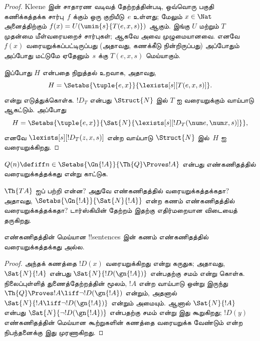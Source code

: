 \documentclass[../../../include/open-logic-section]{subfiles}
\begin{document}
\begin{proof}
Kleene இன் சாதாரண வடிவத் தேற்றத்தின்படி, ஒவ்வொரு பகுதி
கணிக்கத்தக்க சார்பு~$f$ க்கும் ஒரு குறியீடு~$e$ உள்ளது; மேலும்
$x \in \Nat$ அனைத்திற்கும்
$f(x) = U(\umin{s}{T(e,x,s)})$ ஆகும். இங்கு $U$ மற்றும் $T$
முதன்மை மீள்வரையறைச் சார்புகள்; ஆகவே அவை முழுமையானவை. எனவே
$f(x)$ வரையறுக்கப்பட்டிருப்பது (அதாவது, கணக்கீடு நின்றிருப்பது)
அப்போதும் அப்போது மட்டுமே ஏதேனும்~$s$ க்கு $T(e,x,s)$
மெய்யாகும்.

இப்போது $H$ என்பதை நிறுத்தல் உறவாக, அதாவது,
\[
H = \Setabs{\tuple{e,x}}{\lexists[s][T(e, x, s)]}.
\]
என்று எடுத்துக்கொள்க. $!D_T$ என்பது $\Struct{N}$ இல் $T$ ஐ
வரையறுக்கும் வாய்பாடு ஆகட்டும். அப்போது
\[
H = \Setabs{\tuple{e,x}}{\Sat{N}{\lexists[s][!D_T(\num e, \num x, s)]}},
\]
எனவே $\lexists[s][!D_T(z, x, s)]$ என்ற வாய்பாடு
$\Struct{N}$ இல்~$H$ ஐ வரையறுக்கிறது.
\end{proof}

\begin{prob}
$Q(n) \defiff n \in \Setabs{\Gn{!A}}{\Th{Q} \Proves !A}$ என்பது
எண்கணிதத்தில் வரையறுக்கத்தக்கது என்று காட்டுக.
\end{prob}

$\Th{TA}$ ஐப் பற்றி என்ன? அதுவே எண்கணிதத்தில் வரையறுக்கத்தக்கதா?
அதாவது, $\Setabs{\Gn{!A}}{\Sat{N}{!A}}$ என்ற கணம் எண்கணிதத்தில்
வரையறுக்கத்தக்கதா? டார்ஸ்கியின் தேற்றம் இதற்கு எதிர்மறையான விடையைத்
தருகிறது.

\begin{thm}
எண்கணிதத்தின் மெய்யான !!{sentence}s இன் கணம் எண்கணிதத்தில்
வரையறுக்கத்தக்கது அல்ல.
\end{thm}

\begin{proof}
அந்தக் கணத்தை $!D(x)$ வரையறுக்கிறது என்று கருதுக; அதாவது,
$\Sat{N}{!A}$ என்பது $\Sat{N}{!D(\gn{!A})}$ என்பதற்கு
சமம் என்று கொள்க. நிலைப்புள்ளித் துணைத்தேற்றத்தின் மூலம்,
$!A$ என்ற வாய்பாடு ஒன்று இருந்து
$\Th{Q} \Proves !A \liff \lnot !D(\gn{!A})$ என்றும்,
அதனால் $\Sat{N}{!A \liff \lnot !D(\gn{!A})}$ என்றும் அமையும்.
ஆனால் $\Sat{N}{!A}$ என்பது
$\Sat{N}{\lnot !D(\gn{!A})}$ என்பதற்கு சமம் என்று இது
கூறுகிறது; $!D(y)$ எண்கணிதத்தின் மெய்யான கூற்றுகளின் கணத்தை
வரையறுக்க வேண்டும் என்ற நிபந்தனைக்கு இது முரணாகிறது.
\end{proof}
\end{document}

